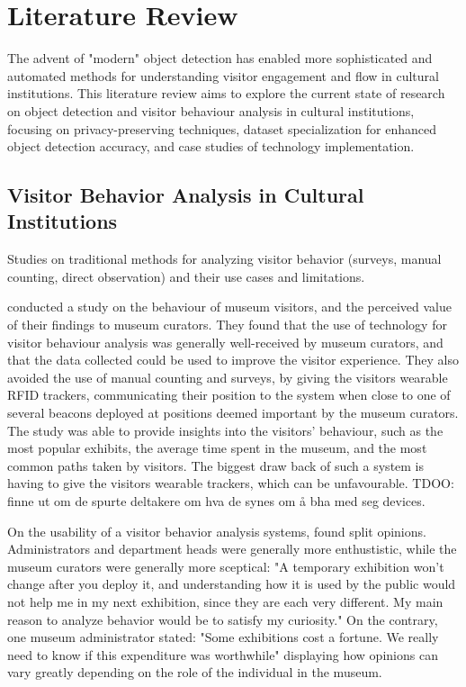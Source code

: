 \section{Literature Review}
The advent of "modern" object detection has enabled more sophisticated and automated methods for understanding visitor engagement and flow in cultural institutions. This literature review aims to explore the current state of research on object detection and visitor behaviour analysis in cultural institutions, focusing on privacy-preserving techniques, dataset specialization for enhanced object detection accuracy, and case studies of technology implementation. 

\subsection{Visitor Behavior Analysis in Cultural Institutions}
Studies on traditional methods for analyzing visitor behavior (surveys, manual counting, direct observation) and their use cases and limitations.


\citeauthor{la2017museumbehaviouranalysis} conducted a study on the behaviour of museum visitors, and the perceived value of their findings to museum curators. They found that the use of technology for visitor behaviour analysis was generally well-received by museum curators, and that the data collected could be used to improve the visitor experience. They also avoided the use of manual counting and surveys, by giving the visitors wearable RFID trackers, communicating their position to the system when close to one of several beacons deployed at positions deemed important by the museum curators. The study was able to provide insights into the visitors' behaviour, such as the most popular exhibits, the average time spent in the museum, and the most common paths taken by visitors. The biggest draw back of such a system is having to give the visitors wearable trackers, which can be unfavourable. TDOO: finne ut om de spurte deltakere om hva de synes om å bha med seg devices.

On the usability of a visitor behavior analysis systems, \cite{la2017museumbehaviouranalysis} found split opinions. Administrators and department heads were generally more enthustistic, while the museum curators were generally more sceptical: "A temporary exhibition won’t
change after you deploy it, and understanding how it is used by the public would not help me in my next exhibition, since they are each very different. My main reason to analyze behavior would be to satisfy my curiosity." On the contrary, one museum administrator stated: "Some exhibitions cost a fortune. We really need to know if this expenditure was worthwhile" displaying how opinions can vary greatly depending on the role of the individual in the museum.


